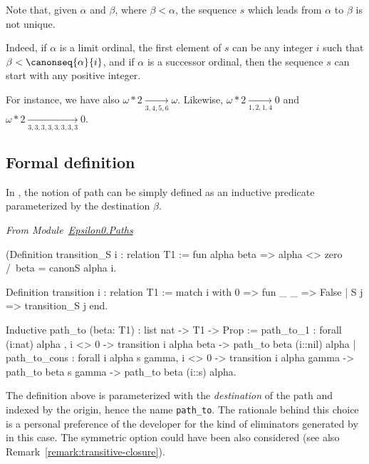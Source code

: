 \begin{remark}
  

Note that, given $\alpha$ and $\beta$, where $\beta < \alpha$, the sequence $s$ which leads from $\alpha$ to $\beta$ is not unique.

Indeed, if $\alpha$ is a limit ordinal, the first element of $s$ can be any integer $i$ such that $\beta<\canonseq{\alpha}{i}$, and if $\alpha$ is a successor ordinal,
then the sequence $s$ can start with any positive integer.


For instance, we have also 
$\omega*2 \xrightarrow[3,4,5,6]{}\omega$. 
Likewise,
$\omega*2 \xrightarrow[1,2,1,4]{} 0$ and
$\omega*2 \xrightarrow[3,3,3,3,3,3,3,3]{} 0$.
\end{remark}

\subsection{Formal definition}

\label{path-to-definition}

In \coq{}, the notion of path can be simply defined as an inductive predicate 
parameterized by the destination $\beta$.

\vspace{4pt}
\emph{From Module~\href{../theories/html/hydras.Epsilon0.Paths.html}{Epsilon0.Paths}}

\label{sect:path-to-def}

\begin{Coqsrc}
(Definition transition_S i : relation T1 :=
  fun alpha beta =>  alpha <> zero /\ beta = canonS alpha i.

Definition transition i : relation T1 :=
  match i with 0 => fun _ _ => False | S j => transition_S j end.

Inductive path_to (beta: T1) : list nat -> T1 -> Prop :=
  path_to_1 : forall (i:nat) alpha , 
    i <> 0 ->
    transition i alpha beta ->
    path_to beta (i::nil) alpha
| path_to_cons : forall i alpha s gamma,
    i <> 0 ->
    transition i alpha gamma ->
    path_to beta  s gamma ->
    path_to beta  (i::s) alpha.
\end{Coqsrc}



\begin{remark}
The definition above is parameterized with the \emph{destination} of the path and indexed by the origin, hence the name \texttt{path\_to}. The rationale behind this choice is a personal preference of the developer  for the kind of eliminators generated by \coq{} in this case. The symmetric option could have been also considered (see also Remark~\vref{remark:transitive-closure}).
\end{remark}



